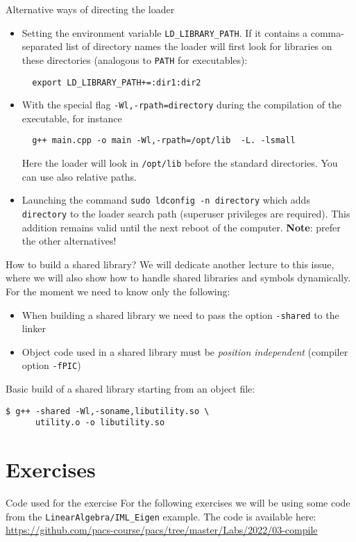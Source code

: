 \documentclass[10pt]{beamer}
\begin{document}
\begin{frame}[fragile]{Alternative ways of directing the loader}
  \begin{itemize}
  \item Setting the environment variable \texttt{LD\_LIBRARY\_PATH}. If
    it contains a comma-separated list of directory names the
    loader will first look for libraries on these directories (analogous to \texttt{PATH} for executables):
\begin{verbatim}
  export LD_LIBRARY_PATH+=:dir1:dir2
\end{verbatim}
\item With the special flag \texttt{-Wl,-rpath=directory}
  during the compilation of the executable, for instance
\begin{verbatim}
  g++ main.cpp -o main -Wl,-rpath=/opt/lib  -L. -lsmall
\end{verbatim}
Here the loader will look in \texttt{/opt/lib} before the standard directories. You can use also relative paths.
\item Launching the command \texttt{sudo ldconfig -n directory} which adds \texttt{directory} to the loader search path (superuser privileges are required). This addition remains valid until the next reboot of the computer. \textbf{Note}: prefer the other alternatives!
  \end{itemize}
\end{frame}

\begin{frame}[fragile]{How to build a shared library?}
  We will dedicate another lecture to this issue, where we will also show how to handle shared libraries and symbols dynamically.
  For the moment we need to know only the following:
  \begin{itemize}
  \item When building a shared library we need to pass the option \texttt{-shared} to the linker
  \item Object code used in a shared library must be \emph{position independent} (compiler option \texttt{-fPIC})
  \end{itemize}

  Basic build of a shared library starting from an object file:
\begin{verbatim}
$ g++ -shared -Wl,-soname,libutility.so \
      utility.o -o libutility.so
\end{verbatim}
\end{frame}


\section{Exercises}
\begin{frame}{Code used for the exercise}
  For the following exercises we will be using some code from the \texttt{LinearAlgebra/IML\_Eigen} example.
  \vfill
  The code is available here: \url{https://github.com/pacs-course/pacs/tree/master/Labs/2022/03-compile}
\end{frame}
\end{document}
